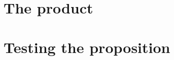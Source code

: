 \documentclass[12pt,a4paper,openany]{report}
\begin{document}
\part{The product}






\part{Testing the proposition}








\appendix









\end{document}
